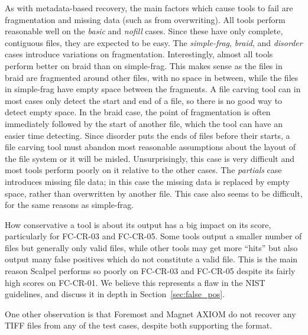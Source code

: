As with metadata-based recovery, the main factors which cause tools to fail are fragmentation and missing data (such as from overwriting).
All tools perform reasonable well on the \emph{basic} and \emph{nofill} cases.
Since these have only complete, contiguous files, they are expected to be easy.
The \emph{simple-frag}, \emph{braid}, and \emph{disorder} cases introduce variations on fragmentation.
Interestingly, almost all tools perform better on braid than on simple-frag.
This makes sense as the files in braid are fragmented around other files, with no space in between, while the files in simple-frag have empty space between the fragments.
A file carving tool can in most cases only detect the start and end of a file, so there is no good way to detect empty space. 
In the braid case, the point of fragmentation is often immediately followed by the start of another file, which the tool can have an easier time detecting.
Since disorder puts the ends of files before their starts, a file carving tool must abandon most reasonable assumptions about the layout of the file system or it will be misled.
Unsurprisingly, this case is very difficult and most tools perform poorly on it relative to the other cases.
The \emph{partials} case introduces missing file data; in this case the missing data is replaced by empty space, rather than overwritten by another file.
This case also seems to be difficult, for the same reasons as simple-frag.

How conservative a tool is about its output has a big impact on its score, particularly for FC-CR-03 and FC-CR-05.
Some tools output a smaller number of files but generally only valid files, while other tools may get more ``hits'' but also output many false positives which do not constitute a valid file.
This is the main reason Scalpel performs so poorly on FC-CR-03 and FC-CR-05 despite its fairly high scores on FC-CR-01.
We believe this represents a flaw in the NIST guidelines, and discuss it in depth in Section~\ref{sec:false_pos}.

One other observation is that Foremost and Magnet AXIOM do not recover any TIFF files from any of the test cases, despite both supporting the format.




